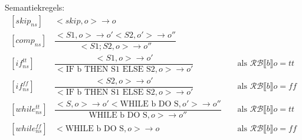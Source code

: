 \documentclass[12pt]{article}
\newcommand{\RB}{\mathcal{RB}}
\begin{document}
Semantiekregels:\\
\renewcommand*{\arraystretch}{2.5}
\[
\begin{matrix}
[skip_{ns}]  & <skip, o> \rightarrow o\\
[comp_{ns}]  & \dfrac{<S1, o> \rightarrow o' <S2, o'> \rightarrow o''}{<S1;S2, o> \rightarrow o''}\\
[if_{ns}^{tt}] & \dfrac{<S1, o> \rightarrow o'}{<\mbox{IF b THEN S1 ELSE S2}, o> \rightarrow o'} &&\mbox{ als }\RB \llbracket b \rrbracket o = tt\\
[if_{ns}^{ff}] & \dfrac{<S2, o> \rightarrow o'}{<\mbox{IF b THEN S1 ELSE S2}, o> \rightarrow o'} &&\mbox{ als }\RB \llbracket b \rrbracket o = ff\\
[while_{ns}^{tt}] & \dfrac{<S, o> \rightarrow o' <\mbox{WHILE b DO S}, o'> \rightarrow o''}{\mbox{WHILE b DO S}, o> \rightarrow o''} &&\mbox{ als }\RB \llbracket b \rrbracket o = tt\\
[while_{ns}^{ff}] & <\mbox{WHILE b DO S}, o> \rightarrow o &&\mbox{ als }\RB \llbracket b \rrbracket o = ff\\
\end{matrix}
\]
\end{document}
